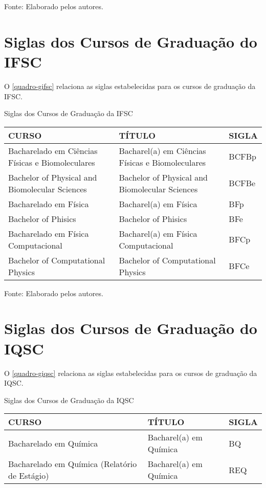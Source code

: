 \begin{apendicesenv}
\begin{quadro}[htb]
\begin{tabular}{|p{6.5cm}|p{6.5cm}|p{1.75cm}|}
	\end{tabular}
	\begin{flushleft}
		Fonte: Elaborado pelos autores.\
	\end{flushleft}
\end{quadro}

\chapter{Siglas dos Cursos de Graduação do IFSC}
O \autoref{quadro-gifsc} relaciona as siglas estabelecidas para os cursos de graduação da IFSC.
\begin{quadro}[htb]
	\ABNTEXfontereduzida
	\caption[Siglas dos Cursos de Graduação da IFSC]{Siglas dos Cursos de Graduação da IFSC}
	\label{quadro-gifsc}
	\begin{tabular}{|p{6.5cm}|p{6.5cm}|p{1.75cm}|}
		\hline
		\textbf{CURSO} & \textbf{TÍTULO} &  \textbf{SIGLA}  \\
		\hline
		Bacharelado em Ciências Físicas e Biomoleculares & Bacharel(a) em  Ciências Físicas e Biomoleculares & BCFBp\\
		Bachelor of Physical and Biomolecular Sciences & Bachelor of Physical and Biomolecular Sciences & BCFBe\\
		Bacharelado em Física & Bacharel(a) em Física & BFp\\
		Bachelor of Phisics & Bachelor of Phisics & BFe\\
		Bacharelado em Física Computacional & Bacharel(a) em Física Computacional & BFCp\\
		Bachelor of Computational Physics & Bachelor of Computational Physics & BFCe\\		
		\hline
		
	\end{tabular}
	\begin{flushleft}
		Fonte: Elaborado pelos autores.\
	\end{flushleft}
\end{quadro}


\chapter{Siglas dos Cursos de Graduação do IQSC}
\index{quadros}O \autoref{quadro-giqsc} relaciona as siglas estabelecidas para os cursos de graduação da IQSC.
\begin{quadro}[htb]
	\ABNTEXfontereduzida
	\caption[Siglas dos Cursos de Graduação da IQSC]{Siglas dos Cursos de Graduação da IQSC}
	\label{quadro-giqsc}
	\begin{tabular}{|p{6.5cm}|p{6.5cm}|p{1.75cm}|}
		\hline
		\textbf{CURSO} & \textbf{TÍTULO} &  \textbf{SIGLA}  \\
		\hline
		Bacharelado em Química & Bacharel(a) em Química & BQ\\
		Bacharelado em Química (Relatório de Estágio)  & Bacharel(a) em Química & REQ\\
		\hline
		

\end{tabular}
\end{quadro}
\end{apendicesenv}
